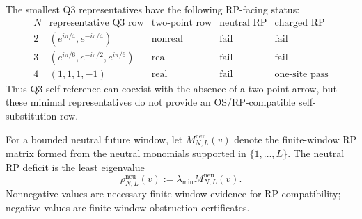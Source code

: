 \begin{principle}
\label{prin:innovation-input-finite-window-rp-audit-table}
The smallest Q3 representatives have the following RP-facing status:
$$
\begin{array}{c|c|c|c|c}
N & \text{representative Q3 row} & \text{two-point row} &
\text{neutral RP} & \text{charged RP}\\
\hline
2 & (e^{i\pi/4},e^{-i\pi/4}) &
\text{nonreal} &
\text{fail} &
\text{fail}\\
3 & (e^{i\pi/6},e^{-i\pi/2},e^{i\pi/6}) &
\text{real} &
\text{fail} &
\text{fail}\\
4 & (1,1,1,-1) &
\text{real} &
\text{fail} &
\text{one-site pass}
\end{array}
$$
Thus Q3 self-reference can coexist with the absence of a two-point arrow,
but these minimal representatives do not provide an OS/RP-compatible
self-substitution row.
\end{principle}

\begin{definition}
\label{def:innovation-input-neutral-rp-deficit}
For a bounded neutral future window, let
$M_{N,L}^{\mathrm{neu}}(v)$ denote the finite-window RP matrix formed from
the neutral monomials supported in $\{1,\ldots,L\}$. The neutral RP deficit
is the least eigenvalue
$$
\rho_{N,L}^{\mathrm{neu}}(v)
:=
\lambda_{\min}M_{N,L}^{\mathrm{neu}}(v).
$$
Nonnegative values are necessary finite-window evidence for RP
compatibility; negative values are finite-window obstruction certificates.
\end{definition}

